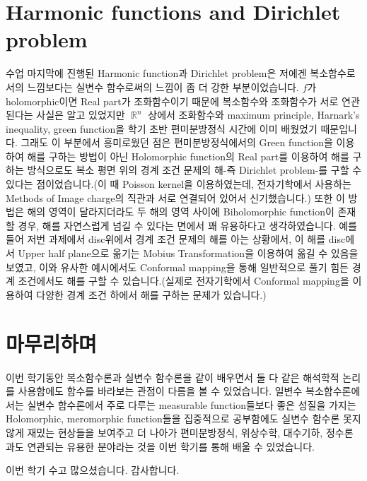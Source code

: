 \documentclass{article}
\DeclareMathOperator{\rr}{\mathbb{R}}
\begin{document}
\section{Harmonic functions and Dirichlet problem}
수업 마지막에 진행된 Harmonic function과 Dirichlet problem은 저에겐 복소함수로서의 느낌보다는 실변수 함수로써의 느낌이 좀 더 강한 부분이었습니다. $f$가 holomorphic이면 Real part가 조화함수이기 때문에 복소함수와 조화함수가 서로 연관된다는 사실은 알고 있었지만 $\rr^n$ 상에서 조화함수와 maximum principle, Harnark's inequality, green function을 학기 초반 편미분방정식 시간에 이미 배웠었기 때문입니다. 그래도 이 부분에서 흥미로웠던 점은 편미분방정식에서의 Green function을 이용하여 해를 구하는 방법이 아닌 Holomorphic function의 Real part를 이용하여 해를 구하는 방식으로도 복소 평면 위의 경계 조건 문제의 해-즉 Dirichlet problem-를 구할 수 있다는 점이었습니다.(이 때 Poisson kernel을 이용하였는데, 전자기학에서 사용하는 Methods of Image charge의 직관과 서로 연결되어 있어서 신기했습니다.) 또한 이 방법은 해의 영역이 달라지더라도 두 해의 영역 사이에 Biholomorphic function이 존재할 경우, 해를 자연스럽게 넘길 수 있다는 면에서 꽤 유용하다고 생각하였습니다. 예를 들어 저번 과제에서 disc위에서 경계 조건 문제의 해를 아는 상황에서, 이 해를 disc에서 Upper half plane으로 옮기는 Mobius Transformation을 이용하여 옮길 수 있음을 보였고, 이와 유사한 예시에서도 Conformal mapping을 통해 일반적으로 풀기 힘든 경계 조건에서도 해를 구할 수 있습니다.(실제로 전자기학에서 Conformal mapping을 이용하여 다양한 경계 조건 하에서 해를 구하는 문제가 있습니다.)

\section{마무리하며}
이번 학기동안 복소함수론과 실변수 함수론을 같이 배우면서 둘 다 같은 해석학적 논리를 사용함에도 함수를 바라보는 관점이 다름을 볼 수 있었습니다. 일변수 복소함수론에서는 실변수 함수론에서 주로 다루는 measurable function들보다 좋은 성질을 가지는 Holomorphic, meromorphic function들을 집중적으로 공부함에도 실변수 함수론 못지 않게 재밌는 현상들을 보여주고 더 나아가 편미분방정식, 위상수학, 대수기하, 정수론과도 연관되는 유용한 분야라는 것을 이번 학기를 통해 배울 수 있었습니다.

이번 학기 수고 많으셨습니다. 감사합니다.
\end{document}
